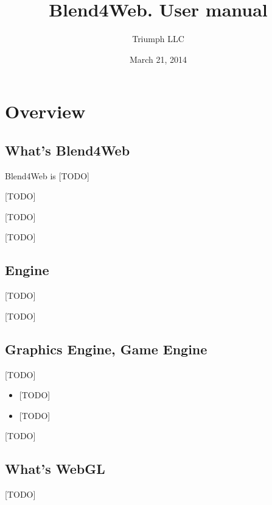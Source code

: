 \documentclass[a4paper,12pt,oneside]{sphinxmanual}
\title{Blend4Web. User manual}
\date{March 21, 2014}
\author{Triumph LLC}
\begin{document}
\maketitle
\tableofcontents
{}\label{index::doc}



\chapter{Overview}
\label{about:about}\label{about::doc}\label{about:id1}
\index{{[}TODO{]}}

\section{What's Blend4Web}
\label{about:about-product}\label{about:blend4web}\label{about:index-0}
Blend4Web is {[}TODO{]}

{[}TODO{]}

{[}TODO{]}

{[}TODO{]}

\index{{[}TODO{]}}

\section{Engine}
\label{about:about-engine}\label{about:id2}\label{about:index-1}
{[}TODO{]}

{[}TODO{]}

\index{{[}TODO{]}}\index{{[}TODO{]}}

\section{Graphics Engine, Game Engine}
\label{about:about-graphics-engine}\label{about:id3}\label{about:index-2}
{[}TODO{]}
\begin{itemize}
\item {} 
{[}TODO{]}

\item {} 
{[}TODO{]}

\end{itemize}

{[}TODO{]}

\index{{[}TODO{]}}

\section{What's WebGL}
\label{about:webgl}\label{about:about-webgl}\label{about:index-3}
{[}TODO{]}
\end{document}
